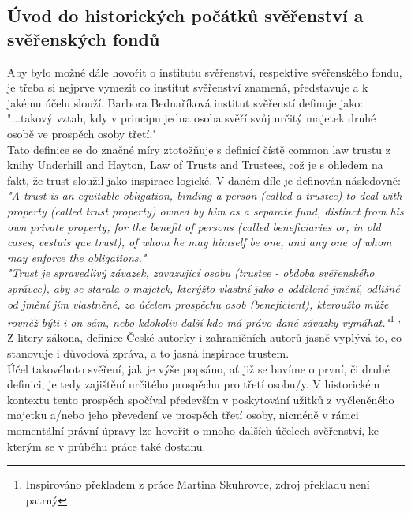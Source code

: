 \documentclass{article}
\begin{document}
\subsection{Úvod do historických počátků svěřenství a svěřenských fondů}

\indent Aby bylo možné dále hovořit o institutu svěřenství, respektive svěřenského fondu, je třeba si nejprve vymezit co institut svěřenství znamená, představuje a k jakému účelu slouží. Barbora Bednaříková institut svěřenstí definuje jako: "...takový vztah, kdy v principu jedna osoba svěří svůj určitý majetek druhé osobě ve prospěch osoby třetí."\\

Tato definice se do značné míry ztotožňuje s definicí čístě common law trustu z knihy Underhill and Hayton, Law of Trusts and Trustees, což je s ohledem na fakt, že trust sloužil jako inspirace logické. V daném díle je definován následovně: \\

\textit{"A trust is an equitable obligation, binding a person (called a trustee) to deal with property (called
trust property) owned by him as a separate fund, distinct from his own private property, for the
benefit of persons (called beneficiaries or, in old cases, cestuis que trust), of whom he may himself
be one, and any one of whom may enforce the obligations."} \\

\textit{"Trust je spravedlivý závazek, zavazující osobu (trustee - obdoba svěřenského správce), aby se starala o majetek, kterýžto vlastní jako o oddělené jmění, odlišné od jmění jím vlastněné, za účelem prospěchu osob (beneficient), kteroužto může rovněž býti i on sám, nebo kdokoliv další kdo má právo dané závazky vymáhat."}\footnote{Inspirováno překladem z práce Martina Skuhrovce, zdroj překladu není patrný} \textsuperscript{,}   \\

Z litery zákona, definice České autorky i zahraničních autorů jasně vyplývá to, co stanovuje i důvodová zpráva, a to jasná inspirace trustem. \\

Účel takovéhoto svěření, jak je výše popsáno, ať již se bavíme o první, či druhé definici, je tedy zajištění určitého prospěchu pro třetí osobu/y. V historickém kontextu tento prospěch spočíval především v poskytování užitků z vyčleněného majetku a/nebo jeho převedení ve prospěch třetí osoby, nicméně v rámci momentální právní úpravy lze hovořit o mnoho dalších účelech svěřenství, ke kterým se v průběhu práce také dostanu.\\
\end{document}
